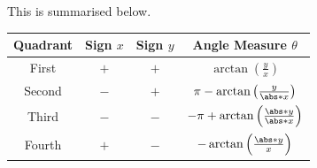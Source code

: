 \documentclass{article}
\begin{document}
This is summarised below.
\begin{table}[H]
    \centering
    \begin{tabular}{c c c c}
        \toprule
        \textbf{Quadrant} & \textbf{Sign} \(x\) & \textbf{Sign} \(y\) & \textbf{Angle Measure} \(\theta\)                            \\
        \midrule
        First             & \({}+{}\)           & \({}+{}\)           & \(\arctan{\left( \frac{y}{x} \right)}\)                      \\
        Second            & \({}-{}\)           & \({}+{}\)           & \(\pi - \arctan{\left( \frac{y}{\abs*{x}} \right)}\)         \\
        Third             & \({}-{}\)           & \({}-{}\)           & \(-\pi + \arctan{\left( \frac{\abs*{y}}{\abs*{x}} \right)}\) \\
        Fourth            & \({}+{}\)           & \({}-{}\)           & \(-\arctan{\left( \frac{\abs*{y}}{x} \right)}\)              \\
        \bottomrule
    \end{tabular}
\end{table}
\end{document}
